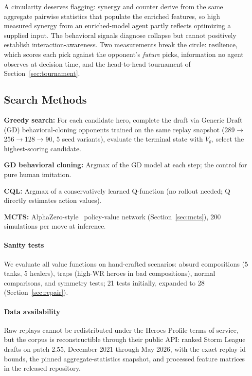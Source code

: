 \documentclass[journal]{IEEEtran}
\begin{document}
A circularity deserves flagging: synergy and counter derive from the same aggregate pairwise statistics that populate the enriched features, so high measured synergy from an enriched-model agent partly reflects optimizing a supplied input. The behavioral signals diagnose collapse but cannot positively establish interaction-awareness. Two measurements break the circle: resilience, which scores each pick against the opponent's \textit{future} picks, information no agent observes at decision time, and the head-to-head tournament of Section~\ref{sec:tournament}.

\subsection{Search Methods}

\textbf{Greedy search:} For each candidate hero, complete the draft via Generic Draft (GD) behavioral-cloning opponents trained on the same replay snapshot (289$\to$256$\to$128$\to$90, 5 seed variants), evaluate the terminal state with $V_\theta$, select the highest-scoring candidate.

\textbf{GD behavioral cloning:} Argmax of the GD model at each step; the control for pure human imitation.

\textbf{CQL:} Argmax of a conservatively learned Q-function (no rollout needed; Q directly estimates action values).

\textbf{MCTS:} AlphaZero-style~\cite{silver2018general} policy-value network (Section~\ref{sec:mcts}), 200 simulations per move at inference.

\paragraph{Sanity tests} We evaluate all value functions on hand-crafted scenarios: absurd compositions (5 tanks, 5 healers), traps (high-WR heroes in bad compositions), normal comparisons, and symmetry tests; 21 tests initially, expanded to 28 (Section~\ref{sec:repair}).

\paragraph{Data availability} Raw replays cannot be redistributed under the Heroes Profile terms of service, but the corpus is reconstructible through their public API: ranked Storm League drafts on patch 2.55, December 2021 through May 2026, with the exact replay-id bounds, the pinned aggregate-statistics snapshot, and processed feature matrices in the released repository.
\end{document}

